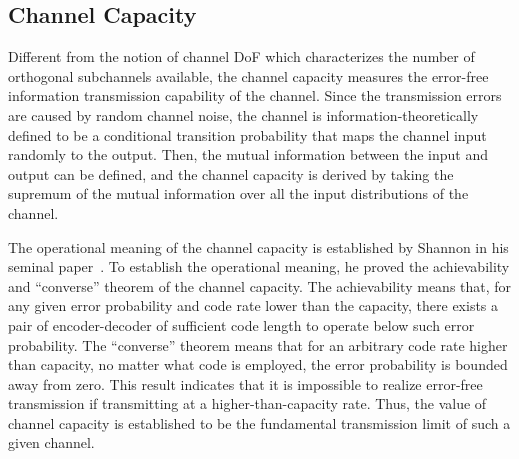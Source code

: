 \documentclass[journal,twocolumn]{IEEEtran}
\begin{document}


\subsection{Channel Capacity}
\label{Sec_2_Subsec_2}
Different from the notion of channel DoF which characterizes the number of orthogonal subchannels available, the channel capacity measures the error-free information transmission capability of the channel. 
Since the transmission errors are caused by random channel noise, the channel is information-theoretically defined to be a conditional transition probability that maps the channel input randomly to the output. 
Then, the mutual information between the input and output can be defined, and the channel capacity is derived by taking the supremum of the mutual information over all the input distributions of the channel. 

The operational meaning of the channel capacity is established by Shannon in his seminal paper~\cite{shannon1948mathematical}. To establish the operational meaning, he proved the achievability and ``converse'' theorem of the channel capacity. The achievability means that, for any given error probability and code rate lower than the capacity, there exists a pair of encoder-decoder of sufficient code length to operate below such error probability. 
The ``converse'' theorem means that for an arbitrary code rate higher than capacity, no matter what code is employed, the error probability is bounded away from zero. This result indicates that it is impossible to realize error-free transmission if transmitting at a higher-than-capacity rate. Thus, the value of channel capacity is established to be the fundamental transmission limit of such a given channel. 
\end{document}
